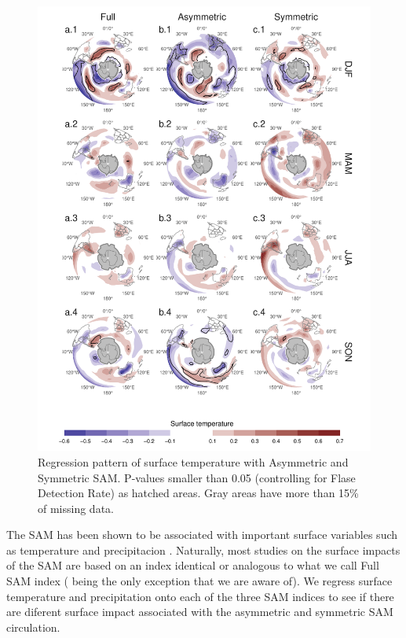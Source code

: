 \documentclass[twocol]{ametsocV5}
\begin{document}
\begin{figure}
\includegraphics{regr-air-season-1} \caption[Regression pattern of surface temperature with Asymmetric and Symmetric SAM]{Regression pattern of surface temperature with Asymmetric and Symmetric SAM. P-values smaller than 0.05 (controlling for Flase Detection Rate) as hatched areas. Gray areas have more than 15\% of missing data.}\label{fig:regr-air-season}
\end{figure}

The SAM has been shown to be associated with important surface variables
such as temperature and precipitacion \citep[e.g.][and see
\citet{fogt2020} for a review]{gillett2006}. Naturally, most studies on
the surface impacts of the SAM are based on an index identical or
analogous to what we call Full SAM index (\citet{fogt2012} being the
only exception that we are aware of). We regress surface temperature and
precipitation onto each of the three SAM indices to see if there are
diferent surface impact associated with the asymmetric and symmetric SAM
circulation.
\end{document}
